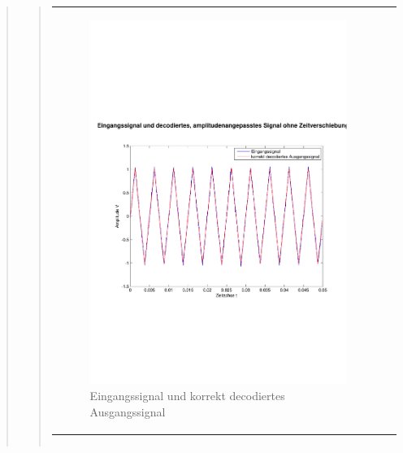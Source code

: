 \begin{quote}
\begin{quote}
\begin{center}
\begin{tabular}{ll}
                \begin{minipage}{0.6\textwidth}
                    \begin{figure}[H]
                        \includegraphics[scale=0.4, trim = 0.8cm 7cm 0.8cm
                        8.5cm, clip]
                        {./Bilder/drei100_Eingang_vs_korrektDecodiert}
                          \caption{Eingangssignal und korrekt decodiertes
                          Ausgangssignal}
                    \end{figure}
                \end{minipage}
            
            \end{tabular}
        \end{center}
        
        
        
        \begin{center}
            \begin{tabular}{ll}
            

\end{tabular}
\end{center}
\end{quote}
\end{quote}
